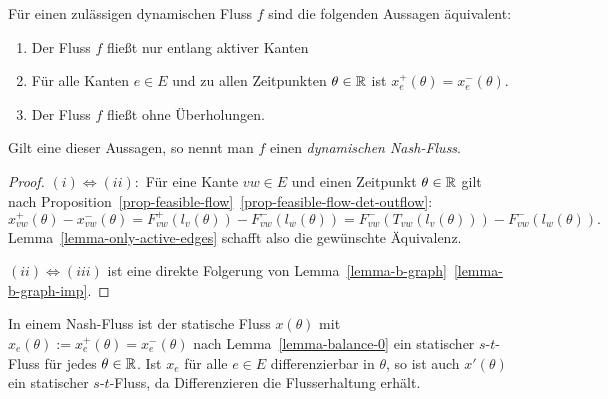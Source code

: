 \begin{theorem}\label{thm-equivalencies-nash-flow}
	Für einen zulässigen dynamischen Fluss $f$ sind die folgenden Aussagen äquivalent:
	\begin{enumerate}[label=(\roman*)]
		\item Der Fluss $f$ fließt nur entlang aktiver Kanten
		\item Für alle Kanten $e\in E$ und zu allen Zeitpunkten $\theta\in\mathbb{R}$ ist $x_e^+(\theta) = x_e^-(\theta)$.
		\item Der Fluss $f$ fließt ohne Überholungen.
	\end{enumerate}
	Gilt eine dieser Aussagen, so nennt man $f$ einen \emph{dynamischen Nash-Fluss}.
\end{theorem}
\begin{proof}
	$(i) \Leftrightarrow (ii):$ Für eine Kante $vw\in E$ und einen Zeitpunkt $\theta\in\mathbb{R}$ gilt nach Proposition~\ref{prop-feasible-flow}~\ref{prop-feasible-flow-det-outflow}:
	$$x_{vw}^+(\theta) - x_{vw}^-(\theta) = F_{vw}^+(l_v(\theta)) - F_{vw}^-(l_w(\theta)) = F_{vw}^-(T_{vw}(l_v(\theta))) - F_{vw}^-(l_w(\theta)).$$
	Lemma~\ref{lemma-only-active-edges} schafft also die gewünschte Äquivalenz.
	
	$(ii) \Leftrightarrow (iii)$ ist eine direkte Folgerung von Lemma~\ref{lemma-b-graph}~\ref{lemma-b-graph-imp}.
\end{proof}

\begin{remark}\label{remark-s-t-flow}
	In einem Nash-Fluss ist der statische Fluss $x(\theta)$ mit $x_e(\theta):=x_e^+(\theta)=x_e^-(\theta)$ nach Lemma~\ref{lemma-balance-0} ein statischer $s$-$t$-Fluss für jedes $\theta\in\mathbb{R}$.
	Ist $x_e$ für alle $e\in E$ differenzierbar in $\theta$, so ist auch $x'(\theta)$ ein statischer $s$-$t$-Fluss, da Differenzieren die Flusserhaltung erhält.
\end{remark}

